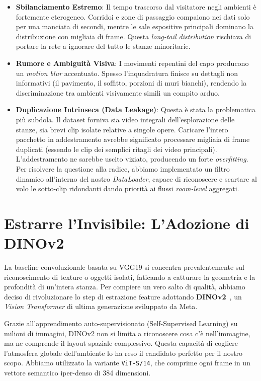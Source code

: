 \documentclass[a4paper,12pt]{report}
\begin{document}
\begin{itemize}
    \item \textbf{Sbilanciamento Estremo}: Il tempo trascorso dal visitatore negli ambienti è fortemente eterogeneo. Corridoi e zone di passaggio compaiono nei dati solo per una manciata di secondi, mentre le sale espositive principali dominano la distribuzione con migliaia di frame. Questa \emph{long-tail distribution} rischiava di portare la rete a ignorare del tutto le stanze minoritarie.
    \item \textbf{Rumore e Ambiguità Visiva}: I movimenti repentini del capo producono un \emph{motion blur} accentuato. Spesso l'inquadratura finisce su dettagli non informativi (il pavimento, il soffitto, porzioni di muri bianchi), rendendo la discriminazione tra ambienti visivamente simili un compito arduo.
    \item \textbf{Duplicazione Intrinseca (Data Leakage)}: Questa è stata la problematica più subdola. Il dataset forniva sia video integrali dell'esplorazione delle stanze, sia brevi clip isolate relative a singole opere. Caricare l'intero pacchetto in addestramento avrebbe significato processare migliaia di frame duplicati (essendo le clip dei semplici ritagli dei video principali). L'addestramento ne sarebbe uscito viziato, producendo un forte \emph{overfitting}. Per risolvere la questione alla radice, abbiamo implementato un filtro dinamico all'interno del nostro \emph{DataLoader}, capace di riconoscere e scartare al volo le sotto-clip ridondanti dando priorità ai flussi \emph{room-level} aggregati.
\end{itemize}

\section{Estrarre l'Invisibile: L'Adozione di DINOv2}
La baseline convoluzionale basata su VGG19 si concentra prevalentemente sul riconoscimento di texture o oggetti isolati, faticando a catturare la geometria e la profondità di un'intera stanza. Per compiere un vero salto di qualità, abbiamo deciso di rivoluzionare lo step di estrazione feature adottando \textbf{DINOv2}~\cite{dinov2}, un \emph{Vision Transformer} di ultima generazione sviluppato da Meta.

Grazie all'apprendimento auto-supervisionato (Self-Supervised Learning) su milioni di immagini, DINOv2 non si limita a riconoscere cosa c'è nell'immagine, ma ne comprende il layout spaziale complessivo. Questa capacità di cogliere l'atmosfera globale dell'ambiente lo ha reso il candidato perfetto per il nostro scopo. Abbiamo utilizzato la variante \texttt{ViT-S/14}, che comprime ogni frame in un vettore semantico iper-denso di 384 dimensioni.
\end{document}
